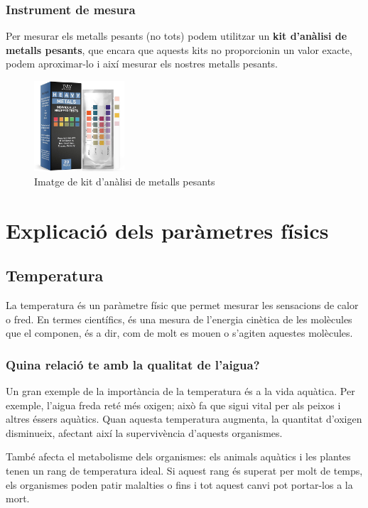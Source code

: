 \subsubsection{Instrument de mesura}
Per mesurar els metalls pesants (no tots) podem utilitzar un \textbf{kit d’anàlisi de metalls pesants}, que encara que aquests kits no proporcionin un valor exacte, podem aproximar-lo i així mesurar els nostres metalls pesants.
\begin{figure}[H]
\centering
\includegraphics[width=0.3\textwidth]{./Figures/metales.jpg}
\caption{Imatge de kit d’anàlisi de metalls pesants}
\label{fig:kitmetall}
\end{figure}
\section{Explicació dels paràmetres físics}

\subsection{Temperatura} \label{subsec:temperatura}
La temperatura és un paràmetre físic que permet mesurar les sensacions de calor o fred. En termes científics, és una mesura de l’energia cinètica de les molècules que el componen, és a dir, com de molt es mouen o s’agiten aquestes molècules.
\subsubsection{Quina relació te amb la qualitat de l'aigua?}
Un gran exemple de la importància de la temperatura és a la vida aquàtica. Per exemple, l’aigua freda reté més oxigen; això fa que sigui vital per als peixos i altres éssers aquàtics. Quan aquesta temperatura augmenta, la quantitat d’oxigen disminueix, afectant així la supervivència d’aquests organismes.

També afecta el metabolisme dels organismes: els animals aquàtics i les plantes tenen un rang de temperatura ideal. Si aquest rang és superat per molt de temps, els organismes poden patir malalties o fins i tot aquest canvi pot portar-los a la mort.

